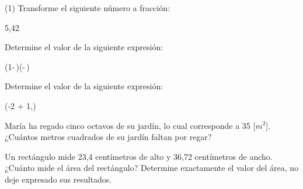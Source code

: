 \documentclass[]{srs}
\begin{document}
\begin{preguntas}(1)
  \pregunta Transforme el siguiente número a fracción:
  \begin{mcaja}
    5,42
  \end{mcaja}
  \begin{malla}[height=7cm]
  \end{malla}
  \pregunta Determine el valor de la siguiente expresión:
  \begin{mcaja}
    \left(1-\,\right)\div\left(-\,\right)
  \end{mcaja}
  \begin{malla}[height=10cm]
  \end{malla}
  \pregunta Determine el valor de la siguiente expresión:
  \begin{mcaja}
    \cdot\left(-2 + 1,\right)
  \end{mcaja}
  \begin{malla}[height=10cm]
  \end{malla}

  \pregunta María ha regado cinco octavos de su jardín, lo cual corresponde a 35 [$m^2$].
  ¿Cuántos metros cuadrados de su jardín faltan por regar?
  \begin{malla}[height=10cm]
  \end{malla}

  \pregunta Un rectángulo mide 23,4 centímetros de alto y 36,72 centímetros de ancho.
  ¿Cuánto mide el área del rectángulo? Determine exactamente el valor del área, no deje
  expresado sus resultados.
  \begin{malla}[height=10cm]
  \end{malla}

\end{preguntas}
\end{document}
